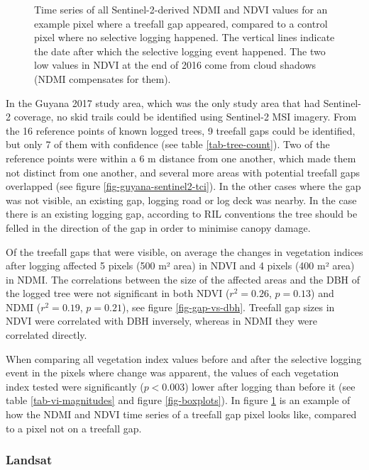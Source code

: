 \documentclass[a4paper,12pt]{scrbook}
\begin{document}
\begin{figure}
\begin{subfigure}[b]{0.45\textwidth}
  \end{subfigure}
  \caption{Time series of all Sentinel-2-derived \ac{NDMI} and \ac{NDVI} values for an example pixel where a treefall gap appeared, compared to a control pixel where no selective logging happened. The vertical lines indicate the date after which the selective logging event happened. The two low values in \ac{NDVI} at the end of 2016 come from cloud shadows (\ac{NDMI} compensates for them).}
  \label{fig-guyana-ts-ndmi}
\end{figure}

In the Guyana 2017 study area, which was the only study area that had Sentinel-2 coverage, no skid trails could be identified using Sentinel-2 \ac{MSI} imagery. From the 16 reference points of known logged trees, 9 treefall gaps could be identified, but only 7 of them with confidence (see table \ref{tab-tree-count}). Two of the reference points were within a 6 m distance from one another, which made them not distinct from one another, and several more areas with potential treefall gaps overlapped (see figure \ref{fig-guyana-sentinel2-tci}). In the other cases where the gap was not visible, an existing gap, logging road or log deck was nearby. In the case there is an existing logging gap, according to \ac{RIL} conventions the tree should be felled in the direction of the gap in order to minimise canopy damage.

Of the treefall gaps that were visible, on average the changes in vegetation indices after logging affected 5 pixels (500 m² area) in \ac{NDVI} and 4 pixels (400 m² area) in \ac{NDMI}. The correlations between the size of the affected areas and the \ac{DBH} of the logged tree were not significant in both \ac{NDVI} ($r^2=0.26$, $p=0.13$) and \ac{NDMI} ($r^2=0.19$, $p=0.21$), see figure \ref{fig-gap-vs-dbh}. Treefall gap sizes in \ac{NDVI} were correlated with \ac{DBH} inversely, whereas in \ac{NDMI} they were correlated directly.

When comparing all vegetation index values before and after the selective logging event in the pixels where change was apparent, the values of each vegetation index tested were significantly ($ p < 0.003 $) lower after logging than before it (see table \ref{tab-vi-magnitudes} and figure \ref{fig-boxplots}). In figure \ref{fig-guyana-ts-ndmi} is an example of how the \ac{NDMI} and \ac{NDVI} time series of a treefall gap pixel looks like, compared to a pixel not on a treefall gap.

\subsubsection{Landsat}
\end{document}
